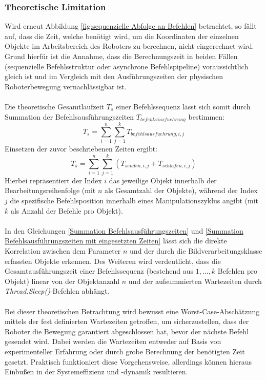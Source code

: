 \subsubsection{Theoretische Limitation}
\label{Theoretische Limitation}
Wird erneut Abbildung \ref{fig:sequenzielle Abfolge an Befehlen} betrachtet, so fällt auf, dass die Zeit, welche benötigt wird, um die Koordinaten der einzelnen Objekte im Arbeitsbereich des Roboters zu berechnen, nicht eingerechnet wird. Grund hierfür ist die Annahme, dass die Berechnungszeit in beiden Fällen (sequenzielle Befehlsstruktur oder asynchrone Befehlspipeline) voraussichtlich gleich ist und im Vergleich mit den Ausführungszeiten der physischen Roboterbewegung vernachlässigbar ist.\\
\\Die theoretische Gesamtlaufzeit $T_{s}$ einer Befehlssequenz lässt sich somit durch Summation der Befehlsausführungszeiten $T_{befehlsausfuehrung}$ bestimmen:
\begin{equation}
	T_{s} = \sum_{i=1}^{n} \sum_{j=1}^{k} T_{befehlsausfuehrung, i, j}
	\label{Summation Befehlsausführungszeiten}
\end{equation}
Einsetzen der zuvor beschriebenen Zeiten ergibt:
\begin{equation}
		T_{s} = \sum_{i=1}^{n} \sum_{j=1}^{k} (T_{senden, i, j} + T_{schlafen, i, j})
		\label{Summation Befehlsausführungszeiten mit eingesetzten Zeiten}
\end{equation}
Hierbei repräsentiert der Index $i$ das jeweilige Objekt innerhalb der Bearbeitungsreihenfolge (mit $n$ als Gesamtzahl der Objekte), während der Index $j$ die spezifische Befehlsposition innerhalb eines Manipulationszyklus angibt (mit $k$ als Anzahl der Befehle pro Objekt).\\
\\In den Gleichungen \ref{Summation Befehlsausführungszeiten} und \ref{Summation Befehlsausführungszeiten mit eingesetzten Zeiten} lässt sich die direkte Korrelation zwischen dem Parameter $n$ und der durch die Bildverarbeitungsklasse erfassten Objekte erkennen. Des Weiteren wird verdeutlicht, dass die Gesamtausführungszeit einer Befehlssequenz (bestehend aus $1,...,k$ Befehlen pro Objekt) linear von der Objektanzahl $n$ und der aufsummierten Wartezeiten durch \textit{Thread.Sleep()}-Befehlen abhängt.\\
\\Bei dieser theoretischen Betrachtung wird bewusst eine Worst-Case-Abschätzung mittels der fest definierten Wartezeiten getroffen, um sicherzustellen, dass der Roboter die Bewegung garantiert abgeschlossen hat, bevor der nächste Befehl gesendet wird. Dabei werden die Wartezeiten entweder auf Basis von experimenteller Erfahrung oder durch grobe Berechnung der benötigten Zeit gesetzt. Praktisch funktioniert diese Vorgehensweise, allerdings können hieraus Einbußen in der Systemeffizienz und -dynamik resultieren.
